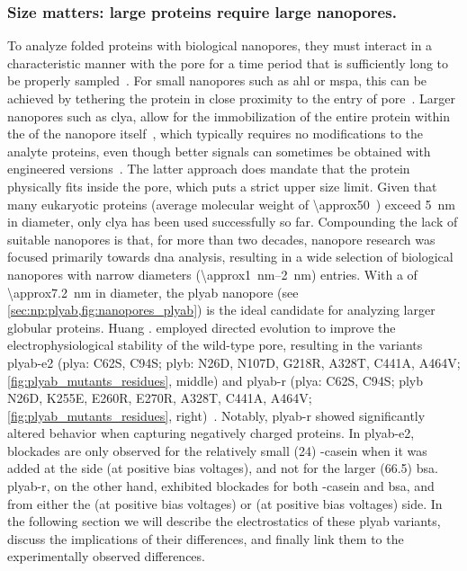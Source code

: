 \subsubsection{Size matters: large proteins require large nanopores.}
%

To analyze folded proteins with biological nanopores, they must interact in a characteristic manner with the
pore for a time period that is sufficiently long to be properly sampled~\cite{Willems-VanMeervelt-2017}. For
small nanopores such as \gls{ahl} or \gls{mspa}, this can be achieved by tethering the protein in close
proximity to the entry of pore~\cite{Movileanu-2000,Fahie-2015,Ho-2015,Laszlo-2016,Thakur-2019}. Larger
nanopores such as \gls{clya}, allow for the immobilization of the entire protein within the \lumen{} of the
nanopore
itself~\cite{Soskine-2012,Soskine-2013,Soskine-Biesemans-2015,Biesemans-2015,Wloka-2016,VanMeervelt-2017,Galenkamp-2018,Galenkamp-2020},
which typically requires no modifications to the analyte proteins, even though better signals can sometimes be
obtained with engineered versions~\cite{Soskine-Biesemans-2015,Galenkamp-2020}. The latter approach does
mandate that the protein physically fits inside the pore, which puts a strict upper size limit. Given that
many eukaryotic proteins (average molecular weight of \SI{\approx50}{\kDa}~\cite{Kozlowski-2016}) exceed
\SI{5}{\nm} in diameter, only \gls{clya} has been used successfully so far. Compounding the lack of suitable
nanopores is that, for more than two decades, nanopore research was focused primarily towards \gls{dna}
analysis, resulting in a wide selection of biological nanopores with narrow diameters
(\SIrange{\approx1}{2}{\nm}) entries. With a \lumen{} of \SI{\approx7.2}{\nm} in diameter, the \gls{plyab}
nanopore (see \cref{sec:np:plyab,fig:nanopores_plyab}) is the ideal candidate for analyzing larger globular
proteins. Huang \etal. employed directed evolution to improve the electrophysiological stability of the
wild-type pore, resulting in the variants \gls{plyab-e2} (\gls{plya}: C62S, C94S; \gls{plyb}: N26D, N107D,
G218R, A328T, C441A, A464V; \cref{fig:plyab_mutants_residues}, middle) and \gls{plyab-r} (\gls{plya}: C62S,
C94S; \gls{plyb} N26D, K255E, E260R, E270R, A328T, C441A, A464V; \cref{fig:plyab_mutants_residues},
right)~\cite{Huang-2020}. Notably, \gls{plyab-r} showed significantly altered behavior when capturing
negatively charged proteins. In \gls{plyab-e2}, blockades are only observed for the relatively small
(\SI{24}{\kDa}) \tb-casein when it was added at the \transi{} side (at positive bias voltages), and not for
the larger (\SI{66.5}{\kDa}) \gls{bsa}. \gls{plyab-r}, on the other hand, exhibited blockades for both
\tb-casein and \gls{bsa}, and from either the \cisi{} (at positive bias voltages) or \transi{} (at positive
bias voltages) side. In the following section we will describe the electrostatics of these \gls{plyab}
variants, discuss the implications of their differences, and finally link them to the experimentally observed
differences.


